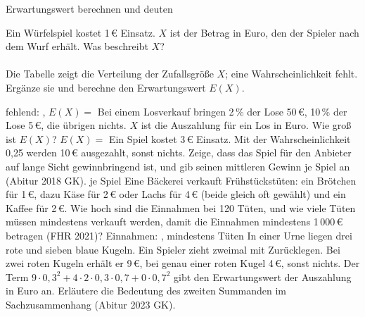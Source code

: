 \setcounter{aufgabe}{8}

\begin{aufgabe}{Erwartungswert berechnen und deuten}
\begin{teile}
\teil Ein Würfelspiel kostet 1\,€ Einsatz. $X$ ist der Betrag in Euro, den der Spieler nach dem Wurf erhält. Was beschreibt $X$? \\  \\ 
\teil Die Tabelle zeigt die Verteilung der Zufallsgröße $X$; eine Wahrscheinlichkeit fehlt. Ergänze sie und berechne den Erwartungswert $E(X)$.

fehlend: \leerfeld , $E(X) = $ \leerfeld
\teil Bei einem Losverkauf bringen 2\,\% der Lose 50\,€, 10\,\% der Lose 5\,€, die übrigen nichts. $X$ ist die Auszahlung für ein Los in Euro. Wie groß ist $E(X)$? $E(X) = $ \leerfeld[€]
\teil Ein Spiel kostet 3\,€ Einsatz. Mit der Wahrscheinlichkeit 0{,}25 werden 10\,€ ausgezahlt, sonst nichts. Zeige, dass das Spiel für den Anbieter auf lange Sicht gewinnbringend ist, und gib seinen mittleren Gewinn je Spiel an \hfill (Abitur 2018 GK). \leerfeld[€] je Spiel
\teil Eine Bäckerei verkauft Frühstückstüten: ein Brötchen für 1\,€, dazu Käse für 2\,€ oder Lachs für 4\,€ (beide gleich oft gewählt) und ein Kaffee für 2\,€. Wie hoch sind die Einnahmen bei 120 Tüten, und wie viele Tüten müssen mindestens verkauft werden, damit die Einnahmen mindestens 1\,000\,€ betragen \hfill (FHR 2021)? Einnahmen: \leerfeld[€] , mindestens \leerfeld Tüten
\teil In einer Urne liegen drei rote und sieben blaue Kugeln. Ein Spieler zieht zweimal mit Zurücklegen. Bei zwei roten Kugeln erhält er 9\,€, bei genau einer roten Kugel 4\,€, sonst nichts. Der Term $9 \cdot 0{,}3^2 + 4 \cdot 2 \cdot 0{,}3 \cdot 0{,}7 + 0 \cdot 0{,}7^2$ gibt den Erwartungswert der Auszahlung in Euro an. Erläutere die Bedeutung des zweiten Summanden im Sachzusammenhang \hfill (Abitur 2023 GK).
\end{teile}
\end{aufgabe}

